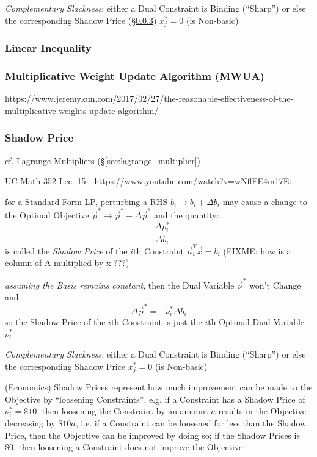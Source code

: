 \emph{Complementary Slackness}: either a Dual Constraint is Binding (``Sharp'')
or else the corresponding Shadow Price (\S\ref{sec:shadow_price}) $x_j^* = 0$
(is Non-basic)



\subsubsection{Linear Inequality}\label{sec:linear_inequality}

\subsubsection{Multiplicative Weight Update Algorithm (MWUA)}\label{sec:mwua}

\url{https://www.jeremykun.com/2017/02/27/the-reasonable-effectiveness-of-the-multiplicative-weights-update-algorithm/}



\subsubsection{Shadow Price}\label{sec:shadow_price}

cf. Lagrange Multipliers (\S\ref{sec:lagrange_multiplier})

UC Math 352 Lec. 15 - \url{https://www.youtube.com/watch?v=wNflFE4m17E}:

for a Standard Form LP, perturbing a RHS $b_i \rightarrow b_i + \Delta{b_i}$
may cause a change to the Optimal Objective
$\vec{p}^* \rightarrow \vec{p}^* + \Delta{\vec{p}^*}$ and the quantity:
\[
  -\frac{\Delta p_i^*}{\Delta b_i}
\]
is called the \emph{Shadow Price} of the $i$th Constraint $\vec{a}_i^T\vec{x} =
b_i$
(FIXME: how is a column of A multiplied by x ???)

\emph{assuming the Basis remains constant}, then the Dual Variable
$\vec{\nu}^*$ won't Change and:
\[
  \Delta \vec{p}^* = - \nu_i^* \Delta b_i
\]
so the Shadow Price of the $i$th Constraint is just the $i$th Optimal Dual
Variable $\nu_i^*$

\emph{Complementary Slackness}: either a Dual Constraint is Binding (``Sharp'')
or else the corresponding Shadow Price $x_j^* = 0$ (is Non-basic)

(Economics) Shadow Prices represent how much improvement can be made to the
Objective by ``loosening Constraints'', e.g. if a Constraint has a Shadow Price
of $\nu_i^* = \$10$, then loosening the Constraint by an amount $a$ results in
the Objective decreasing by $\$10 a$, i.e. if a Constraint can be loosened for
less than the Shadow Price, then the Objective can be improved by doing so; if
the Shadow Prices is \$0, then loosening a Constraint does not improve the
Objective

